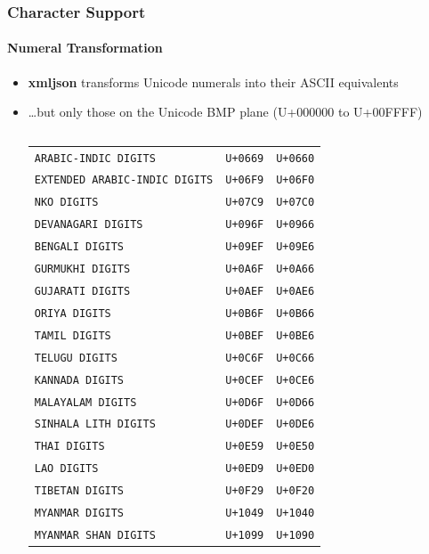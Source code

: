 \documentclass[
    alternativetitlepage=alternativ,
    cornerlogo=hgi_nds_logo2,
    sectionoverview,
]{rubpresentation}
\begin{document}
\begin{frame}
  \frametitle{Character Support}
  \framesubtitle{Numeral Transformation}
  \begin{itemize}
    \item{} \textbf{xmljson} transforms Unicode numerals into their ASCII equivalents
    \item{} \dots{}but only those on the Unicode BMP plane (U+000000 to U+00FFFF)
      \begingroup
      \tiny
  \begin{columns}
    \begin{column}{0.5\textwidth}
      \begin{center}
      \begin{tabular}{lrr}
\texttt{ARABIC-INDIC DIGITS} & \texttt{U+0669} & \texttt{U+0660}\\
\texttt{EXTENDED ARABIC-INDIC DIGITS} & \texttt{U+06F9} &  \texttt{U+06F0}\\
\texttt{NKO DIGITS} & \texttt{U+07C9} &  \texttt{U+07C0}\\
\texttt{DEVANAGARI DIGITS} & \texttt{U+096F} &  \texttt{U+0966}\\
\texttt{BENGALI DIGITS} & \texttt{U+09EF} &  \texttt{U+09E6}\\
\texttt{GURMUKHI DIGITS} & \texttt{U+0A6F} &  \texttt{U+0A66}\\
\texttt{GUJARATI DIGITS} & \texttt{U+0AEF} &  \texttt{U+0AE6}\\
\texttt{ORIYA DIGITS} & \texttt{U+0B6F} &  \texttt{U+0B66}\\
\texttt{TAMIL DIGITS} & \texttt{U+0BEF} &  \texttt{U+0BE6}\\
\texttt{TELUGU DIGITS} & \texttt{U+0C6F} &  \texttt{U+0C66}\\
\texttt{KANNADA DIGITS} & \texttt{U+0CEF} &  \texttt{U+0CE6}\\
\texttt{MALAYALAM DIGITS} & \texttt{U+0D6F} &  \texttt{U+0D66}\\
\texttt{SINHALA LITH DIGITS} & \texttt{U+0DEF} &  \texttt{U+0DE6}\\
\texttt{THAI DIGITS} & \texttt{U+0E59} &  \texttt{U+0E50}\\
\texttt{LAO DIGITS} & \texttt{U+0ED9} &  \texttt{U+0ED0}\\
\texttt{TIBETAN DIGITS} & \texttt{U+0F29} &  \texttt{U+0F20}\\
\texttt{MYANMAR DIGITS} & \texttt{U+1049} &  \texttt{U+1040}\\
\texttt{MYANMAR SHAN DIGITS} & \texttt{U+1099} &  \texttt{U+1090}\\
    \end{tabular}

\end{center}
\end{column}
\end{columns}
\end{itemize}
\end{frame}
\end{document}
